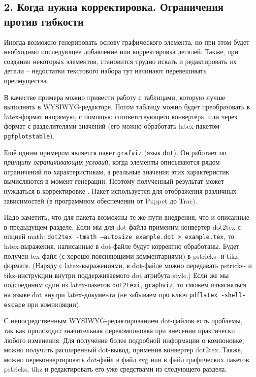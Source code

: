 \documentclass[10pt, a5paper]{article}
\begin{document}
\subsection*{2. Когда нужна корректировка. Ограничения против гибкости}

Иногда возможно генерировать основу графического элемента, 
но при этом будет необходимо последующее добавление или корректировка деталей. 
Также, при создании некоторых элементов, становится трудно искать и редактировать их детали --
недостатки текстового набора тут начинают перевешивать преимущества.

В качестве примера можно привести работу с таблицами, которую лучше выполнять в WYSIWYG-редакторе. 
Потом таблицу можно будет преобразовать в latex-формат напрямую, с помощью соответствующего конвертера, 
или через формат с разделителями значений (его можно обработать latex-пакетом \texttt{pgfplotstable}).     

Ещё одним примером является пакет \texttt{grafviz} (язык \texttt{dot}).
Он работает по \textit{принципу ограничивающих условий}, когда
элементы описываются рядом ограничений по характеристикам, а реальные значения этих 
характеристик вычисляются в момент генерации. Поэтому полученный результат 
может нуждаться в корректировке \cite{RG3}. Пакет используется для отображения различных зависимостей 
(в программном обеспечении от Puppet до Trac). 

Надо заметить, что для пакета возможны те же пути внедрения, что и описанные в предыдущем разделе.
Если мы для dot-файла применим конвертер dot2tex с опцией math: 
\texttt{dot2tex -tmath --autosize example.dot > example.tex}, то latex-выражения, написанные в 
dot-файле будут корректно обработаны. Будет получен tex-файл (с хорошо поясняющими комментариями)
в pstricks- и tikz-формате. (Наряду с latex-выражениями, в dot-файле можно передавать pstricks- и tikz-инструкции
внутри поддерживаемого dot атрибута style.)
Если же мы подсоединим один из latex-пакетов \texttt{dot2texi}, \texttt{graphviz}, то сможем изъясняться на языке dot внутри latex-документа
(не забываем про ключ \texttt{pdflatex -shell-escape} при компиляции).

С непосредственным WYSIWYG-редактированием dot-файлов есть проблемы, так как происходит значительная перекомпоновка 
при внесении практически любого изменения. Для получение более подробной информации о компоновке, можно 
получить расширенный dot-вывод, применив конвертер dot2tex.
Также, можно переконвертировать dot-файл в файл svg или в файл графических пакетов pstricks, tikz  
и редактировать его уже средствами из следующего раздела.
\end{document}
